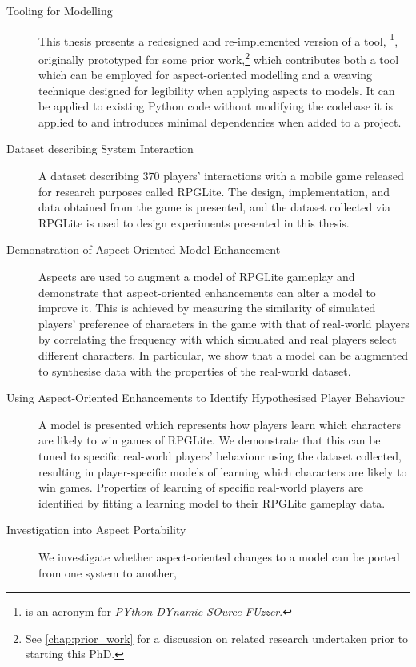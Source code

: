 \begin{description}
  \item[Tooling for \AspectOriented{} Modelling] This thesis presents a
    redesigned and re-implemented version of a tool, \pydysofu{}\footnote{\pydysofu{} is
    an acronym for \emph{PYthon DYnamic SOurce FUzzer}.}, originally prototyped
    for some prior work,\footnote{See \cref{chap:prior_work} for a discussion on
    related research undertaken prior to starting this PhD.} which contributes
    both a tool which can be employed for aspect-oriented modelling and a
    weaving technique designed for legibility when applying aspects to models.
    It can be applied to existing Python code without modifying the codebase it
    is applied to and introduces minimal dependencies when added to a project.
  \item[Dataset describing \SocioTechnical System Interaction] A dataset
    describing 370 players' interactions with a mobile game released for
    research purposes called RPGLite. The design, implementation, and data
    obtained from the game is presented, and the dataset collected via RPGLite
    is used to design experiments presented in this thesis.
  \item[Demonstration of Aspect-Oriented Model Enhancement] Aspects are used to
    augment a model of RPGLite gameplay and demonstrate that aspect-oriented
    enhancements can alter a model to improve it. This is achieved by measuring
    the similarity of simulated players' preference of characters in the game
    with that of real-world players by correlating the frequency with which
    simulated and real players select different characters. In particular, we
    show that a model can be augmented to synthesise data with the properties of
    the real-world dataset.
  \item[Using Aspect-Oriented Enhancements to Identify Hypothesised Player
    Behaviour] A model is presented which represents how players learn which
    characters are likely to win games of RPGLite. We demonstrate that this can
    be tuned to specific real-world players' behaviour using the dataset
    collected, resulting in player-specific models of learning which characters
    are likely to win games. Properties of learning of specific real-world
    players are identified by fitting a learning model to their RPGLite gameplay
    data.
  \item[Investigation into Aspect Portability] We investigate whether
    aspect-oriented changes to a model can be ported from one system to another,

\end{description}
